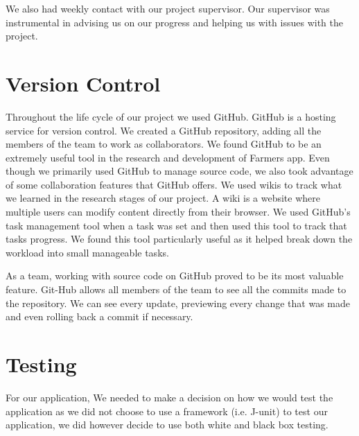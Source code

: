 \documentclass[12pt,a4paper,oneside,openany]{book}
\begin{document}

\noindent We also had weekly contact with our project supervisor. Our supervisor was instrumental in advising us on our progress and helping us with issues with the project.

\section{Version Control}
Throughout the life cycle of our project we used GitHub. GitHub is a hosting service for version control. We created a GitHub repository, adding all the members of the team to work as collaborators. We found GitHub to be an extremely useful tool in the research and development of Farmers app. Even though we primarily used GitHub to manage source code, we also took advantage of some collaboration features that GitHub offers. We used wikis to track what we learned in the research stages of our project. A wiki is a website where multiple users can modify content directly from their browser. We used GitHub’s task management tool when a task was set and then used this tool to track that tasks progress.  We found this tool particularly useful as it helped break down the workload into small manageable tasks.

\noindent As a team, working with source code on GitHub proved to be its most valuable feature. Git-Hub allows all members of the team to see all the commits made to the repository. We can see every update, previewing every change that was made and even rolling back a commit if necessary.

\section{Testing}
For our application, We needed to make a decision on how we would test the application as we did not choose to use a framework (i.e. J-unit) to test our application, we did however decide to use both white and black box testing.
\end{document}
